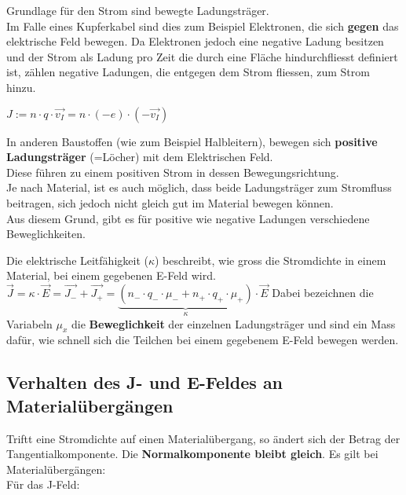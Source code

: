 					Grundlage für den Strom sind bewegte Ladungsträger. \\
					Im Falle eines Kupferkabel sind dies zum Beispiel Elektronen, die sich \textbf{gegen} das
					elektrische Feld bewegen. Da Elektronen jedoch eine negative Ladung besitzen und der Strom als Ladung pro Zeit die durch eine Fläche hindurchfliesst definiert ist, zählen negative Ladungen, die entgegen dem Strom fliessen, zum Strom hinzu.

					\begin{center}
						$\displaystyle J := n \cdot q \cdot \vec{v_I} = n \cdot (-e) \cdot (-\vec{v_I}) $
					\end{center}

					In anderen Baustoffen (wie zum Beispiel Halbleitern), bewegen sich \textbf{positive Ladungsträger} (=Löcher) mit dem Elektrischen Feld. \\
					Diese führen zu einem positiven Strom in dessen Bewegungsrichtung. \\
					Je nach Material, ist es auch möglich, dass beide Ladungsträger zum Stromfluss beitragen, sich jedoch nicht gleich gut im Material bewegen können. \\
					Aus diesem Grund, gibt es für positive wie negative Ladungen verschiedene Beweglichkeiten.

					\beginip
					Die elektrische Leitfähigkeit ($\kappa$) beschreibt, wie gross die Stromdichte in einem Material, bei einem gegebenen E-Feld wird. \\
					\formulaBegin
					$\displaystyle \vec{J} = \kappa \cdot \vec{E} = \vec{J_{-}} + \vec{J_{+}} = \underbrace{(n_{-} \cdot q_{-} \cdot \mu_- + n_+ \cdot q_+ \cdot \mu_{+})}_{\kappa} \cdot \vec{E}$
					\formulaEnd
					Dabei bezeichnen die Variabeln $\mu_{x}$ die \textbf{Beweglichkeit} der einzelnen Ladungsträger und sind ein Mass dafür, wie schnell sich die Teilchen bei einem gegebenem E-Feld bewegen werden.
					\iend


					\subsection{Verhalten des J- und E-Feldes an Materialübergängen}
					Triftt eine Stromdichte auf einen Materialübergang, so ändert sich der Betrag der Tangentialkomponente. Die \textbf{Normalkomponente bleibt gleich}.
					\begingl
					Es gilt bei Materialübergängen: \\
					Für das J-Feld:
					\fspace
					\formulaBegin

